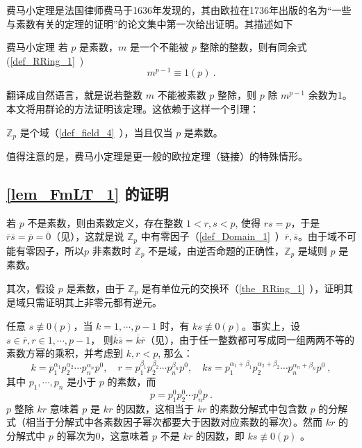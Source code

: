 费马小定理是法国律师费马于1636年发现的，其由欧拉在1736年出版的名为“一些与素数有关的定理的证明”的论文集中第一次给出证明。其描述如下
\begin{theorem}{费马小定理}\label{the_FmLT_1}
若 $p$ 是素数，$m$ 是一个不能被 $p$ 整除的整数，则有同余式(\autoref{def_RRing_1}~)
\begin{equation}\label{eq_FmLT_3}
m^{p-1}\equiv 1(p)~.
\end{equation}
\end{theorem}
翻译成自然语言，就是说若整数 $m$ 不能被素数 $p$ 整除，则 $p$ 除 $m^{p-1}$ 余数为1。本文将用群论的方法证明该定理。这依赖于这样一个引理：
\begin{lemma}{}\label{lem_FmLT_1}
 $\mathbb Z_p$ 是个域（\autoref{def_field_4}~），当且仅当 $p$ 是素数。
\end{lemma}

值得注意的是，费马小定理是更一般的欧拉定理（链接）的特殊情形。
\subsection{\autoref{lem_FmLT_1} 的证明}\label{sub_FmLT_1}
若 $p$ 不是素数，则由素数定义，存在整数 $1<r,s<p$, 使得 $rs=p$，于是 $\overline r\overline s=\overline p=\overline 0$（见），这就是说 $\mathbb Z_p$ 中有零因子（\autoref{def_Domain_1}~）$\overline r,\overline s$。由于域不可能有零因子，所以$p$ 非素数时 $\mathbb Z_p$ 不是域，由逆否命题的正确性，$\mathbb Z_p$ 是域则 $p$ 是素数。

其次，假设 $p$ 是素数，由于 $\mathbb Z_p$ 是有单位元的交换环（\autoref{the_RRing_1}~），证明其是域只需证明其上非零元都有逆元。

任意 $s\not\equiv 0(p)$，当 $k=1,\cdots,p-1$ 时，有 $ks\not\equiv 0(p)$。事实上，设 $s\in\overline r, r\in{1,\cdots,p-1}$， 则$\overline k\overline s=\overline k\overline r$（见），由于任一整数都可写成同一组两两不等的素数方幂的乘积，并考虑到 $k,r<p$, 那么：
\begin{equation}
k=p_1^{\alpha_1}p_2^{\alpha_2}\cdots p_n^{\alpha_n}p^0, \quad r=p_1^{\beta_1}p_2^{\beta_2}\cdots p_n^{\beta_n}p^0,\quad ks=p_1^{\alpha_1+\beta_1}p_2^{\alpha_2+\beta_2}\cdots p_n^{\alpha_n+\beta_n}p^0~,
\end{equation}
其中 $p_1,\cdots,p_n$ 是小于 $p$ 的素数，而
\begin{equation}
p=p_1^0p_2^0\cdots p_n^{0}p~.
\end{equation}
$p$ 整除 $kr$ 意味着 $p$ 是 $kr$ 的因数，这相当于 $kr$ 的素数分解式中包含数 $p$ 的分解式（相当于分解式中各素数因子幂次都要大于因数对应素数的幂次）。然而 $kr$ 的分解式中 $p$ 的幂次为0，这意味着 $p$ 不是 $kr$ 的因数，即 $ks\not\equiv 0(p)$ 。


